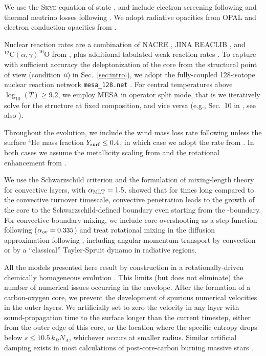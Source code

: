 \documentclass[%
trackchanges,twocolumn]{aastex701}
\DeclareRobustCommand{\Secref}[1]{Sec.~\ref{#1}}
\begin{document}
We use the \textsc{Skye} equation of state \citep{jermyn:skye}, and
include electron screening following \citet{Chugunov2007} and thermal
neutrino losses following \citet{Itoh1996}. We adopt radiative
opacities from OPAL \citep{Iglesias1993, Iglesias1996}
and electron conduction opacities from \citet{Cassisi2007}.

Nuclear reaction rates are a combination of NACRE \citep{Angulo1999},
JINA REACLIB \citep{Cyburt2010}, and
$^{12}\mathrm{C}(\alpha,\gamma)^{16}\mathrm{O}$ from \cite{kunz:02},
plus additional tabulated weak reaction rates \citet{Fuller1985,
  Oda1994, Langanke2000}. To capture with sufficient accuracy the
deleptonization of the core from the structural point of view
(condition \emph{ii}) in \Secref{sec:intro}), we adopt the
fully-coupled 128-isotope nuclear reaction network
\texttt{mesa\_128.net} \citep[see Appendix.~\ref{sec:mesa128}
and][]{farmer:16}. For central temperatures above
$\log_{10}(T)\ge 9.2$, we employ \textsc{MESA} in operator split mode,
that is we iteratively solve for the structure at fixed composition,
and vice versa (e.g., Sec.~10 in \citealt{jermyn:23}, see also
  \citealt{farmer:16, limongi:24, limongi:25}).

Throughout the evolution, we include the wind mass loss rate following
\cite{vink:00} unless the surface $^{4}\mathrm{He}$ mass
fraction $Y_{\rm surf}\le0.4$, in which case we adopt the rate from
\cite{nugis:00}. In both cases we assume the metallicity scaling from
\cite{vink:01} and the rotational enhancement from \cite{friend:86}
\citep[see also][]{langer:98}.

We use the Schwarzschild criterion and the \cite{henyey:65}
formulation of mixing-length theory for convective layers, with
$\alpha_{\rm MLT}=1.5$. \cite{anders:22} showed that for times
  long compared to the convective turnover timescale, convective
  penetration leads to the growth of the core to the
  Schwarzschild-defined boundary even starting from the
  \cite{ledoux:47}-boundary. For convective boundary mixing, we
include core overshooting as a step-function following \cite{brott:11}
($\alpha_{\rm ov}=0.335$) and treat rotational mixing in the diffusion
approximation following \cite{heger:00}, including angular momentum
transport by convection or by a ``classical'' Tayler-Spruit dynamo
\citep{spruit:02} in radiative regions.


All the models presented here result by construction in a
rotationally-driven chemically homogeneous evolution \cite[CHE,
e.g.,][]{maeder:00, yoon:06}. This limits (but does not eliminate) the
number of numerical issues occurring in the envelope. After the
formation of a carbon-oxygen core, we prevent the development of
spurious numerical velocities in the outer layers. We artificially set
to zero the velocity in any layer with sound-propagation time to the
surface longer than the current timestep, either from the outer edge
of this core, or the location where the specific entropy drops below
$s\le10.5\,k_{B}N_{A}$, whichever occurs at smaller radius.
Similar artificial damping exists in most calculations of
post-core-carbon burning massive stars
\citep[e.g.,][]{aguilera-dena:18}.
\end{document}
